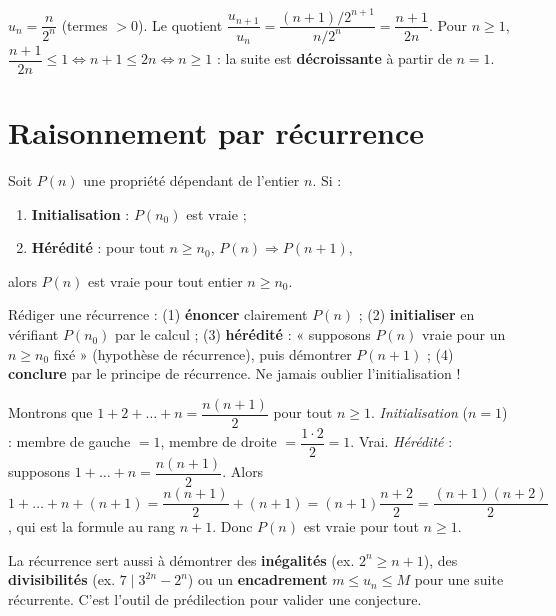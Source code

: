 \begin{exemple}
$u_n=\dfrac{n}{2^n}$ (termes $>0$). Le quotient
$\dfrac{u_{n+1}}{u_n}=\dfrac{(n+1)/2^{n+1}}{n/2^n}=\dfrac{n+1}{2n}$.
Pour $n\ge1$, $\dfrac{n+1}{2n}\le1\iff n+1\le2n\iff n\ge1$ : la suite est \textbf{décroissante} à partir de $n=1$.
\end{exemple}

\section{Raisonnement par récurrence}

\begin{theoreme}
Soit $P(n)$ une propriété dépendant de l'entier $n$. Si :
\begin{enumerate}[label=\arabic*)]
\item \textbf{Initialisation} : $P(n_0)$ est vraie ;
\item \textbf{Hérédité} : pour tout $n\ge n_0$, $P(n)\Rightarrow P(n+1)$,
\end{enumerate}
alors $P(n)$ est vraie pour tout entier $n\ge n_0$.
\end{theoreme}

\begin{aretenir}
Rédiger une récurrence : (1) \textbf{énoncer} clairement $P(n)$ ; (2) \textbf{initialiser}
en vérifiant $P(n_0)$ par le calcul ; (3) \textbf{hérédité} : « supposons $P(n)$ vraie pour un
$n\ge n_0$ fixé » (hypothèse de récurrence), puis démontrer $P(n+1)$ ; (4) \textbf{conclure}
par le principe de récurrence. Ne jamais oublier l'initialisation !
\end{aretenir}

\begin{exemple}
Montrons que $1+2+\dots+n=\dfrac{n(n+1)}{2}$ pour tout $n\ge1$.
\emph{Initialisation} ($n=1$) : membre de gauche $=1$, membre de droite $=\dfrac{1\cdot2}{2}=1$. Vrai.
\emph{Hérédité} : supposons $1+\dots+n=\dfrac{n(n+1)}{2}$. Alors
$1+\dots+n+(n+1)=\dfrac{n(n+1)}{2}+(n+1)=(n+1)\dfrac{n+2}{2}=\dfrac{(n+1)(n+2)}{2}$,
qui est la formule au rang $n+1$. Donc $P(n)$ est vraie pour tout $n\ge1$.
\end{exemple}

\begin{remarque}
La récurrence sert aussi à démontrer des \textbf{inégalités} (ex. $2^n\ge n+1$), des
\textbf{divisibilités} (ex. $7\mid 3^{2n}-2^n$) ou un \textbf{encadrement} $m\le u_n\le M$
pour une suite récurrente. C'est l'outil de prédilection pour valider une conjecture.
\end{remarque}


